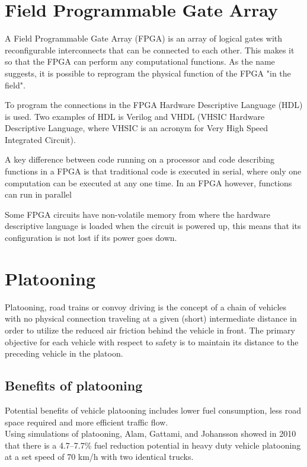 \section{Field Programmable Gate Array}
A Field Programmable Gate Array (FPGA) is an array of logical gates with reconfigurable interconnects that can be connected to each other. This makes it so that the FPGA can perform any computational functions. As the name suggests, it is possible to reprogram the physical function of the FPGA "in the field".

To program the connections in the FPGA Hardware Descriptive Language (HDL) is used. Two examples of HDL is Verilog and VHDL (VHSIC Hardware Descriptive Language, where VHSIC is an acronym for Very High Speed Integrated Circuit). 

A key difference between code running on a processor and code describing functions in a FPGA is that traditional code is executed in serial, where only one computation can be executed at any one time. In an FPGA however, functions can run in parallel 

Some FPGA circuits have non-volatile memory from where the hardware descriptive language is loaded when the circuit is powered up, this means that its configuration is not lost if its power goes down.

\section{Platooning}
Platooning, road trains or convoy driving is the concept of a chain of vehicles with no physical connection traveling at a given (short) intermediate distance in order to utilize the reduced air friction behind the vehicle in front. The primary objective for each vehicle with respect to safety is to maintain its distance to the preceding vehicle in the platoon.

\subsection{Benefits of platooning}
Potential benefits of vehicle platooning includes lower fuel consumption, less road space required and more efficient traffic flow.\\ 

Using simulations of platooning, Alam, Gattami, and Johansson \cite{johansson2010} showed in 2010 that there is a \mbox{4.7--7.7\%} fuel reduction potential in heavy duty vehicle platooning at a set speed of 70 km/h with two identical trucks.\\

